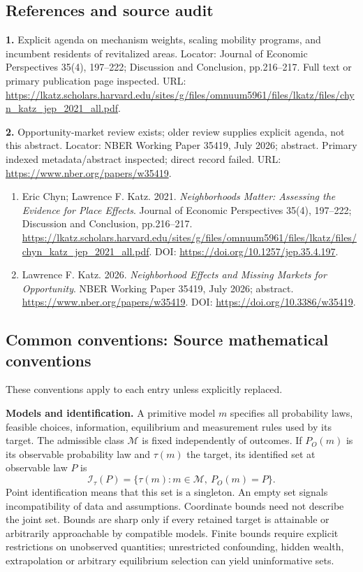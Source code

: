 \documentclass[11pt,a4paper]{article}
\begin{document}
\subsection*{References and source audit}
\textbf{1.} Explicit agenda on mechanism weights, scaling mobility programs, and incumbent residents of revitalized areas. Locator: Journal of Economic Perspectives 35(4), 197–222; Discussion and Conclusion, pp.216–217. Full text or primary publication page inspected. URL: \url{https://lkatz.scholars.harvard.edu/sites/g/files/omnuum5961/files/lkatz/files/chyn_katz_jep_2021_all.pdf}.

\textbf{2.} Opportunity-market review exists; older review supplies explicit agenda, not this abstract. Locator: NBER Working Paper 35419, July 2026; abstract. Primary indexed metadata/abstract inspected; direct record failed. URL: \url{https://www.nber.org/papers/w35419}.
\begin{enumerate}\raggedright
\item\hypertarget{definitions:source:30007746:1}{} Eric Chyn; Lawrence F. Katz. 2021. \emph{Neighborhoods Matter: Assessing the Evidence for Place Effects}. Journal of Economic Perspectives 35(4), 197–222; Discussion and Conclusion, pp.216–217.
\url{https://lkatz.scholars.harvard.edu/sites/g/files/omnuum5961/files/lkatz/files/chyn_katz_jep_2021_all.pdf}.
DOI: \url{https://doi.org/10.1257/jep.35.4.197}.
\item\hypertarget{definitions:source:30007746:2}{} Lawrence F. Katz. 2026. \emph{Neighborhood Effects and Missing Markets for Opportunity}. NBER Working Paper 35419, July 2026; abstract.
\url{https://www.nber.org/papers/w35419}.
DOI: \url{https://doi.org/10.3386/w35419}.
\end{enumerate}

\subsection*{Common conventions: Source mathematical conventions}

These conventions apply to each entry unless explicitly replaced.

\textbf{Models and identification.} A primitive model \(m\) specifies all probability laws, feasible choices, information, equilibrium and measurement rules used by its target. The admissible class \(\mathcal M\) is fixed independently of outcomes. If \(P_O(m)\) is its observable probability law and \(\tau(m)\) the target, its identified set at observable law \(P\) is
\[
 \mathcal I_\tau(P)=\{\tau(m):m\in\mathcal M,\ P_O(m)=P\}.
\]
Point identification means that this set is a singleton. An empty set signals incompatibility of data and assumptions. Coordinate bounds need not describe the joint set. Bounds are sharp only if every retained target is attainable or arbitrarily approachable by compatible models. Finite bounds require explicit restrictions on unobserved quantities; unrestricted confounding, hidden wealth, extrapolation or arbitrary equilibrium selection can yield uninformative sets.
\end{document}
